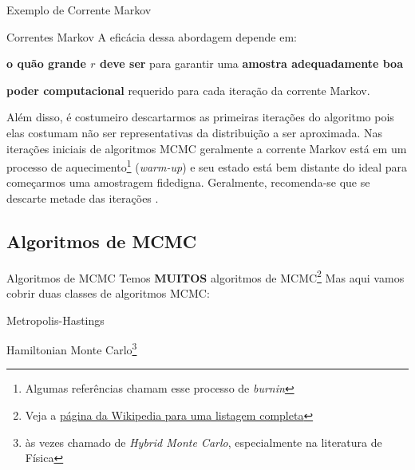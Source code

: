 \begin{frame}{Exemplo de Corrente Markov}
  \centering
\end{frame}

\begin{frame}{Correntes Markov}
  A eficácia dessa abordagem depende em:

  \begin{vfilleditems}
    \item \textbf{o quão grande $r$ deve ser} para garantir uma \textbf{amostra adequadamente boa}
    \item \textbf{poder computacional} requerido para cada iteração da corrente Markov.
  \end{vfilleditems}

  \vfill
  \footnotesize
  Além disso, é costumeiro descartarmos as primeiras iterações do algoritmo pois
  elas costumam não ser representativas da distribuição a ser aproximada.
  Nas iterações iniciais de algoritmos MCMC geralmente a corrente Markov
  está em um processo de aquecimento\footnote{Algumas referências chamam esse processo de \textit{burnin}}
  (\textit{warm-up}) e seu estado está bem distante do ideal para começarmos uma amostragem
  fidedigna.
  \vfill
  Geralmente, recomenda-se que se descarte metade das iterações \parencite{gelmanBasicsMarkovChain2013}.
\end{frame}

\subsection{Algoritmos de MCMC}
\begin{frame}{Algoritmos de MCMC}
  Temos \textbf{MUITOS} algoritmos de MCMC\footnote{Veja a \href{https://en.wikipedia.org/wiki/Markov_chain_Monte_Carlo}{página da Wikipedia para uma listagem completa}}
  Mas aqui vamos cobrir duas classes de algoritmos MCMC:
  \begin{vfilleditems}
    \item Metropolis-Hastings \parencite{metropolisEquationStateCalculations1953, hastingsMonteCarloSampling1970}

    \item Hamiltonian Monte Carlo\footnote{às vezes chamado de \textit{Hybrid Monte Carlo}, especialmente na literatura de Física} \parencite{neal2011mcmc, betancourtConceptualIntroductionHamiltonian2017}
  \end{vfilleditems}
\end{frame}


